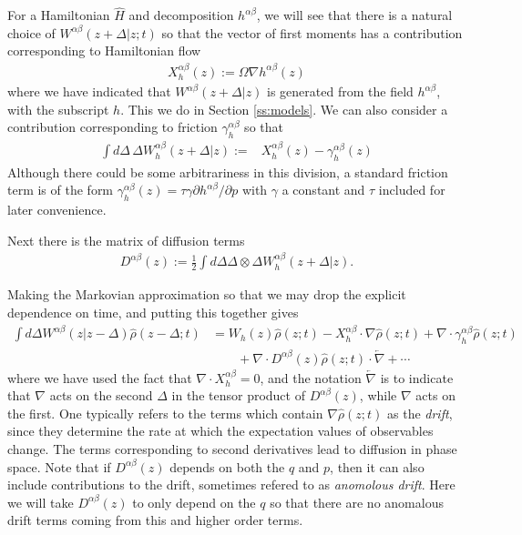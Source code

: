 \documentclass[aps,pra,showpacs,citeautoscript,amsmath,amssymb,floatfix,superscriptaddress,bbm, verbatim,amsfonts,changes,11pt,nofootinbib,longbibliography]{revtex4-2}
\def\p{{\bf p}_{\vec k}}
\def\z{{z}}
\def\Hq{\hat{H}}
\def\dist{{\Delta}}
\def\ddist{{d\!\dist}}
\def\p{{p}}
\def\rate{{W}}
\def\ab{^{\alpha\beta}}
\renewcommand{\varrho}{\hat{\rho}}
\def\psiz{{\varrho(\z;t)}}
\def\psizd{{\varrho(\z-\dist;t)}}
\def\friction{\gamma}
\begin{document}
For a Hamiltonian $\Hq$ and decomposition $h\ab$, we will see that there is a natural choice of $\rate\ab(\z+\dist|\z;t)$ so that the vector of first moments has a contribution corresponding to Hamiltonian flow
\begin{align}
X^{\alpha\beta}_h(\z):=\Omega \nabla h\ab(\z)
\end{align}
where we have indicated that $\rate\ab(\z+\dist|\z)$ is generated from the field $h^{\alpha\beta}$, with the subscript $h$. This we do in Section \ref{ss:models}. We can also consider a contribution corresponding to friction $\friction\ab_h$ so that
\begin{align}
\int\ddist\,\dist\rate_h^{\alpha\beta}(\z+\dist|\z):=
&X^{\alpha\beta}_h(\z)- \friction\ab_h(\z)
\label{eq:firstmoment}
\end{align}
Although there could be some arbitrariness in this division, a standard friction term is of the form $\friction\ab_h(\z)=\tau\gamma\partial h\ab/\partial \p$ with $\gamma$ a constant and $\tau$ included for later convenience. 

Next there is the matrix of diffusion terms
\begin{align}
D^{\alpha\beta}(\z):=\frac{1}{2}\int \ddist\dist\otimes\dist\rate_h^{\alpha\beta}(\z+\dist|\z).
\label{eq:secondmoment}
\end{align}

Making the Markovian approximation so that we may drop the explicit dependence on time, and putting this together gives
\begin{align}
\int \ddist\rate^{\alpha\beta}(\z|\z-\dist)\psizd
&=\rate_h(\z)\psiz-X_h\ab\cdot\nabla\psiz
+
\nabla\cdot\friction_h\ab\psiz
\nonumber\\
&\qquad + \nabla\cdot D^{\alpha\beta}(\z)\psiz\cdot\overleftarrow{\nabla}
+ \cdots
\label{eq:W-KM}
\end{align}
where we have used the fact that $\nabla\cdot X_h^{\alpha\beta}=0$,
and the notation $\overleftarrow{\nabla}$ is to indicate that $\nabla$ acts on the second $\dist$ in the tensor product of $D^{\alpha\beta}(\z)$, while $\nabla$ acts on the first. One typically refers to the terms which contain $\nabla\psiz$ as the {\it drift}, since they determine the rate at which the expectation values of observables change. The terms corresponding to second derivatives lead to diffusion in phase space. Note that if $D^{\alpha\beta}(\z)$ depends on both the $q$ and $p$, then it can also include contributions to the drift, sometimes refered to as {\it anomolous drift}. Here we will take $D^{\alpha\beta}(\z)$ to only depend on the $q$ so that there are no anomalous drift terms coming from this and higher order terms.
\end{document}
